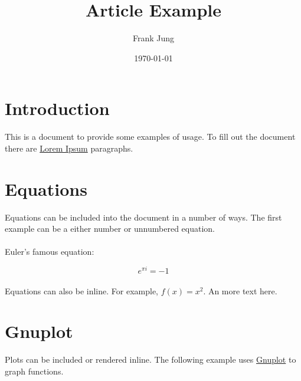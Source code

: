 \documentclass[10pt,a4paper]{article}
\title{\LaTeXe{} Article Example}
\author{Frank Jung}
\date{\today}
\begin{document}
\maketitle{}
\newpage{}

\tableofcontents{}
\listoffigures{}
\listoflistings{}
\listoftables{}
\newpage{}

\newpage{}

\newcommand{\sectionbreak}{\clearpage}

\section*{Introduction}

This is a \LaTeXe{} document to provide some examples of usage. To fill out the
document there are \href{http://www.lipsum.com/}{Lorem Ipsum} paragraphs.

\lipsum[1]

\sectionbreak{}

\section*{Equations}

Equations can be included into the document in a number of ways. The first
example can be a either number or unnumbered equation.

\paragraph{}
Euler's famous equation:

\begin{equation}
  e^{\pi i} = -1
\end{equation}

\paragraph{}
Equations can also be inline. For example, $f(x) = x^2$. An more text here.
\lipsum[2]

\sectionbreak{}

\section*{Gnuplot}

Plots can be included or rendered inline. The following example uses
\href{http://www.gnuplot.info/}{Gnuplot} to graph functions.
\end{document}
